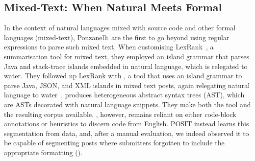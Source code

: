 \subsection{Mixed-Text: When Natural Meets Formal}
\label{chapter:literature:sec:posit_rel_work:mixed}

In the context of natural languages mixed with source code and other formal
languages (mixed-text), Ponzanelli~\etal are the first to go beyond using
regular expressions to parse such mixed text. When customising
LexRank~\cite{Ponzanelli2015b}, a summarisation tool for mixed text, they
employed an island grammar that parses Java and stack-trace islands embedded in
natural language, which is relegated to water. They followed up LexRank with
\stormed, a tool that uses an island grammar to parse Java, JSON, and XML
islands in mixed text \SO posts, again relegating natural language to
water~\cite{Ponzanelli2015a}.  \stormed produces heterogeneous abstract syntax
trees (AST), which are ASTs decorated with natural language snippets. They make
both the tool and the resulting corpus available. \stormed, however, remains
reliant on either code-block annotations or heuristics to discern code from
English. POSIT instead learns this segmentation from data, and, after a manual
evaluation, we indeed observed it to be capable of segmenting \SO posts where
submitters forgotten to include the appropriate formatting
().